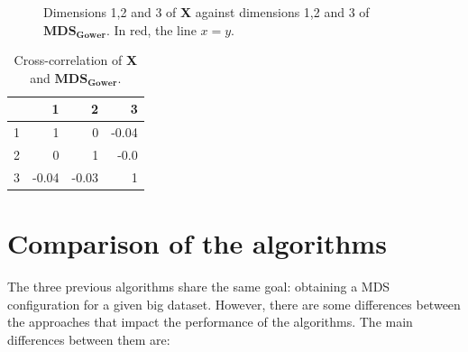 \documentclass[11pt]{report}
\begin{document}
\begin{figure}[!ht]
    \centering
    \caption{Dimensions 1,2 and 3 of \textbf{X} against dimensions 1,2 and 3 of  $\mathbf{MDS_{Gower}}$. \newline
            In red, the line $x=y$.}%
    \label{gower_example}%
\end{figure}


\begin{table}[ht]
\centering
\begin{tabular}{rrrr}
 & 1 & 2 & 3 \\ 
  \hline
  1 & 1 & 0 & -0.04 \\ 
  2 & 0 & 1 & -0.0 \\ 
  3 & -0.04 & -0.03 & 1 \\ 
   \hline
\end{tabular}
\caption{Cross-correlation of \textbf{X} and $\mathbf{MDS_{Gower}}$.} 
\label{corr_gower}
\end{table}


\section{Comparison of the algorithms}
\indent The three previous algorithms share the same goal: obtaining a MDS 
configuration for a given big dataset. However, there are some differences 
between the approaches that impact the performance of the algorithms. 
The main differences between them are:
\end{document}
